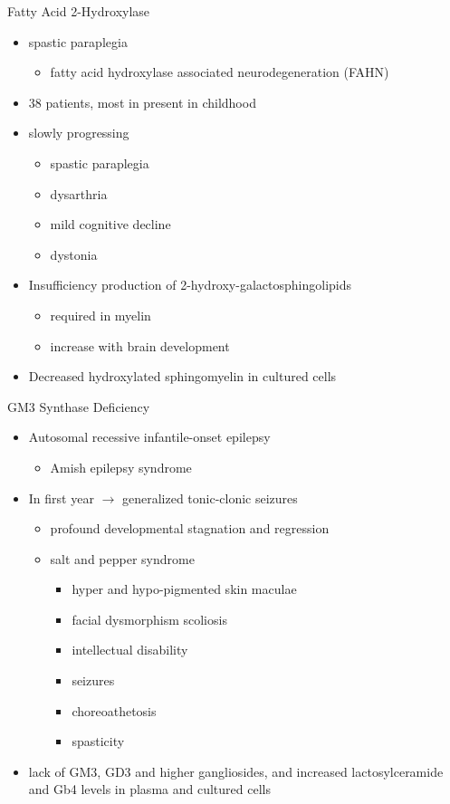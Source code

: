\documentclass[presentation, smaller]{beamer}
\begin{document}
\begin{frame}[label={sec:orgheadline9}]{Fatty Acid 2-Hydroxylase}
\begin{itemize}
\item spastic paraplegia
\begin{itemize}
\item fatty acid hydroxylase associated neurodegeneration (FAHN)
\end{itemize}
\item 38 patients, most in present in childhood
\item slowly progressing
\begin{itemize}
\item spastic paraplegia
\item dysarthria
\item mild cognitive decline
\item dystonia
\end{itemize}

\item Insufficiency production of 2-hydroxy-galactosphingolipids
\begin{itemize}
\item required in myelin
\item increase with brain development
\end{itemize}

\item Decreased hydroxylated sphingomyelin in cultured cells
\end{itemize}
\end{frame}

\begin{frame}[label={sec:orgheadline10}]{GM3 Synthase Deficiency}
\begin{itemize}
\item Autosomal recessive infantile-onset epilepsy
\begin{itemize}
\item Amish epilepsy syndrome
\end{itemize}
\item In first year \(\to\) generalized tonic-clonic seizures
\begin{itemize}
\item profound developmental stagnation and regression
\item salt and pepper syndrome
\begin{itemize}
\item hyper and hypo-pigmented skin maculae
\item facial dysmorphism scoliosis
\item intellectual disability
\item seizures
\item choreoathetosis
\item spasticity
\end{itemize}
\end{itemize}

\item lack of GM3, GD3 and higher gangliosides, and increased
lactosylceramide and Gb4 levels in plasma and cultured cells
\end{itemize}
\end{frame}
\end{document}
